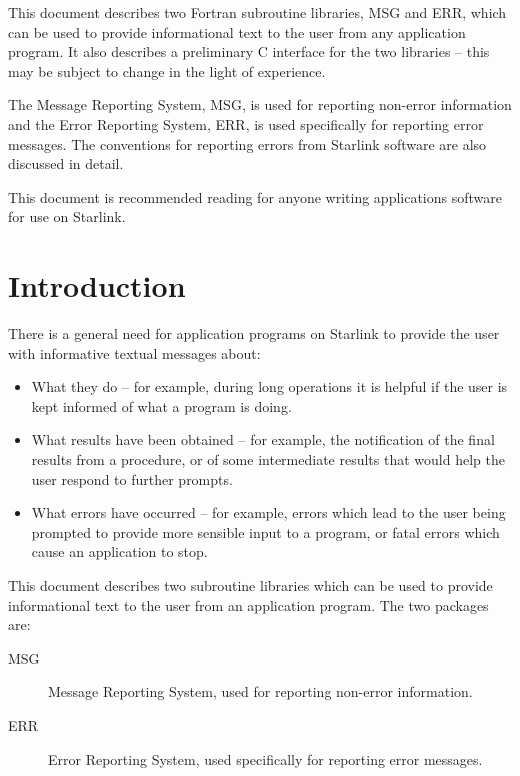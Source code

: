\documentclass[twoside,11pt]{article}
\newcommand{\stardocinitials}  {SUN}
\newcommand{\stardocnumber}    {104.11}
\newcommand{\stardocabstract}  {
This document describes two Fortran subroutine libraries, MSG and ERR, which 
can be used to provide informational text to the user from any application 
program.
It also describes a preliminary C interface for the two libraries --
this may be subject to change in the light of experience.
\par
The Message Reporting System, MSG, is used for reporting non-error information
and the Error Reporting System, ERR, is used specifically for reporting error
messages.
The conventions for reporting errors from Starlink software are also
discussed in detail.
\par
This document is recommended reading for anyone writing applications
software for use on Starlink.
}
\newcommand{\stardocname}{\stardocinitials /\stardocnumber}
\newenvironment{latexonly}{}{}
\newcommand{\xlabel}[1]{}
\renewcommand{\_}{\texttt{\symbol{95}}}
\renewcommand{\thepage}{\roman{page}}
\begin{document}
\stardocabstract
  \newpage
  \begin{latexonly}
    \setlength{\parskip}{0mm}
    \tableofcontents
    \setlength{\parskip}{\medskipamount}
    \markboth{\stardocname}{\stardocname}
  \end{latexonly}
\cleardoublepage
\renewcommand{\thepage}{\arabic{page}}
\setcounter{page}{1}


\section{\xlabel{introduction}Introduction}

There is a general need for application programs on Starlink to provide the
user with informative textual messages about:

\begin {itemize}
\item What they do -- for example, during long operations it is helpful if the
user is kept informed of what a program is doing.

\item What results have been obtained -- for example, the notification of  the
final results from a procedure, or of some intermediate results that would help
the user respond to further prompts. 

\item What errors have occurred -- for example, errors which lead to the user
being prompted to provide more sensible input to a program, or fatal
errors which cause an application to stop.
\end {itemize}

This document describes two subroutine libraries which can be used to provide
informational text to the user from an application program.
The two packages are:

\begin {description}
\item [MSG] Message Reporting System, used for reporting non-error information. 
\item [ERR] Error Reporting System, used specifically for reporting error
messages.
\end {description}
\end{document}
